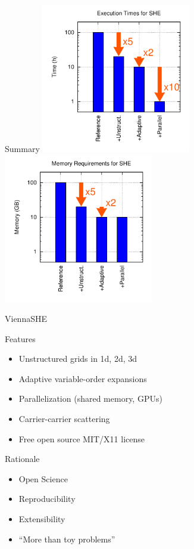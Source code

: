\documentclass[usepdftitle=false,10pt]{beamer}
\begin{document}
\begin{frame}{Summary}
  \includegraphics[width=0.49\textwidth]{summary-exec-all}
  \includegraphics[width=0.49\textwidth]{summary-memory-all}
\end{frame}


\begin{frame}{ViennaSHE}
  \begin{block}{Features}
   \begin{itemize}
    \item Unstructured grids in 1d, 2d, 3d
    \item Adaptive variable-order expansions
    \item Parallelization (shared memory, GPUs)
    \item Carrier-carrier scattering
    \item Free open source MIT/X11 license
   \end{itemize}
  \end{block}
  
  \begin{block}{Rationale}
   \begin{itemize}
    \item Open Science
    \item Reproducibility
    \item Extensibility
    \item ``More than toy problems''
   \end{itemize}
  \end{block}
  
\end{frame}
\end{document}
